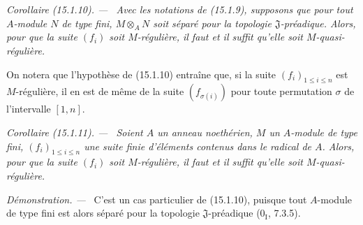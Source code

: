 \documentclass[10pt,oneside]{book}
\makeatletter
\newcommand{\setmanualcurrentlabel}[1]{\def\@currentlabel{#1}}
\newenvironment{corollary}[1][]{%
  \setmanualcurrentlabel{#1}\par\medskip\noindent\itshape Corollaire (#1). ---\ }{\par}
\newenvironment{proof}{%
  \par\medskip\noindent\textit{Démonstration. ---\ }}{\par}
\makeatother
\begin{document}
\begin{corollary}[15.1.10]
\label{0.15.1.10-fr}
Avec les notations de (15.1.9), supposons que pour tout $A$-module $N$ de type
fini, $M\otimes_A N$ soit séparé pour la topologie
$\mathfrak{J}$-préadique. Alors, pour que la suite $(f_i)$ soit
$M$-régulière, il faut et il suffit qu'elle soit $M$-quasi-régulière.
\end{corollary}

On notera que l'hypothèse de (15.1.10) entraîne que, si la suite
$(f_i)_{1\leq i\leq n}$ est $M$-régulière, il en est de même de la suite
$(f_{\sigma(i)})$ pour toute permutation $\sigma$ de l'intervalle $[1,n]$.

\begin{corollary}[15.1.11]
\label{0.15.1.11-fr}
Soient $A$ un anneau noethérien, $M$ un $A$-module de type fini,
$(f_i)_{1\leq i\leq n}$ une suite finie d'éléments contenus dans le radical de
$A$. Alors, pour que la suite $(f_i)$ soit $M$-régulière, il faut et il suffit
qu'elle soit $M$-quasi-régulière.
\end{corollary}

\begin{proof}
C'est un cas particulier de (15.1.10), puisque tout $A$-module de type fini
est alors séparé pour la topologie $\mathfrak{J}$-préadique
($0_{\mathrm I}$, 7.3.5).
\end{proof}
\end{document}
